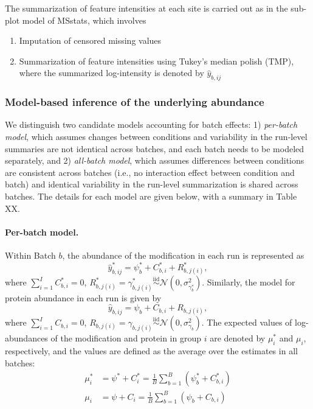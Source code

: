 \documentclass{mcp}
\begin{document}
The summarization of feature intensities at each site is carried out as in the sub-plot model of MSstats, which involves
\begin{enumerate}
\item Imputation of censored missing values
\item Summarization of feature intensities using Tukey's median polish (TMP), where the summarized log-intensity is denoted by $\hat{y}_{b, ij}$
\end{enumerate}


\subsubsection{Model-based inference of the underlying abundance}

We distinguish two candidate models accounting for batch effects: 1) \emph{per-batch model}, which assumes changes between conditions and variability in the run-level summaries are not identical across batches, and each batch needs to be modeled separately, and 2) \emph{all-batch model}, which assumes differences between conditions are consistent across batches (i.e., no interaction effect between condition and batch) and identical variability in the run-level summarization is shared across batches. The details for each model are given below, with a summary in Table XX.

\paragraph{Per-batch model.}
Within Batch $b$, the abundance of the modification in each run is represented as 
\[
\hat{y}_{b, ij}^{\ast} = \psi_{b}^{\ast} + C_{b, i}^{\ast} + R_{b, j(i)}^{\ast},
\]
where $\sum_{i=1}^{I} C_{b, i}^{\ast} = 0$, $R_{b, j(i)}^{\ast} = \gamma_{b, j(i)}^{\ast} \stackrel{\text{iid}}{\sim} \mathcal{N}(0, \sigma_{\gamma_{b}^{\ast}}^{2})$.
Similarly, the model for protein abundance in each run is given by
\[
\hat{y}_{b, ij} = \psi_{b} + C_{b, i} + R_{b, j(i)},
\]
where $\sum_{i=1}^{I} C_{b, i} = 0$, $R_{b, j(i)} = \gamma_{b, j(i)} \stackrel{\text{iid}}{\sim} \mathcal{N}(0, \sigma_{\gamma_{b}}^{2})$. The expected values of log-abundances of the modification and protein in group $i$ are denoted by $\mu_{i}^{\ast}$ and $\mu_{i}$, respectively, and the values are defined as the average over the estimates in all batches:
\begin{align*}
\mu_{i}^{\ast} &= \psi^{\ast} + C_{i}^{\ast} = \frac{1}{B} \sum_{b=1}^{B} (\psi_{b}^{\ast} + C_{b, i}^{\ast})\\
\mu_{i} &= \psi + C_{i} = \frac{1}{B} \sum_{b=1}^{B} (\psi_{b} + C_{b, i})
\end{align*}
\end{document}
